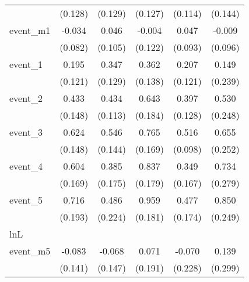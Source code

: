 {\begin{tabular}{l*{5}{c}}
            &     (0.128)         &     (0.129)         &     (0.127)         &     (0.114)         &     (0.144)         \\
[1em]
event\_m1    &      -0.034         &       0.046         &      -0.004         &       0.047         &      -0.009         \\
            &     (0.082)         &     (0.105)         &     (0.122)         &     (0.093)         &     (0.096)         \\
[1em]
event\_1     &       0.195         &       0.347\sym{**} &       0.362\sym{**} &       0.207         &       0.149         \\
            &     (0.121)         &     (0.129)         &     (0.138)         &     (0.121)         &     (0.239)         \\
[1em]
event\_2     &       0.433\sym{**} &       0.434\sym{***}&       0.643\sym{***}&       0.397\sym{**} &       0.530\sym{*}  \\
            &     (0.148)         &     (0.113)         &     (0.184)         &     (0.128)         &     (0.248)         \\
[1em]
event\_3     &       0.624\sym{***}&       0.546\sym{***}&       0.765\sym{***}&       0.516\sym{***}&       0.655\sym{**} \\
            &     (0.148)         &     (0.144)         &     (0.169)         &     (0.098)         &     (0.252)         \\
[1em]
event\_4     &       0.604\sym{***}&       0.385\sym{*}  &       0.837\sym{***}&       0.349\sym{*}  &       0.734\sym{**} \\
            &     (0.169)         &     (0.175)         &     (0.179)         &     (0.167)         &     (0.279)         \\
[1em]
event\_5     &       0.716\sym{***}&       0.486\sym{*}  &       0.959\sym{***}&       0.477\sym{**} &       0.850\sym{***}\\
            &     (0.193)         &     (0.224)         &     (0.181)         &     (0.174)         &     (0.249)         \\
\hline
lnL         &                     &                     &                     &                     &                     \\
event\_m5    &      -0.083         &      -0.068         &       0.071         &      -0.070         &       0.139         \\
            &     (0.141)         &     (0.147)         &     (0.191)         &     (0.228)         &     (0.299)         \\

\end{tabular}}
